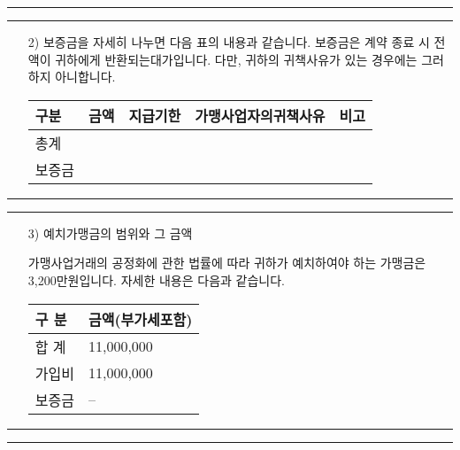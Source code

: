 \documentclass[a5paper,10pt]{oblivoir}
\newcommand\crule[3][black]{\textcolor{#1}{\rule{#2}{#3}}}
\begin{document}
\begin{enumerate}
\newpage
\begin{center}
\crule[red]{4cm}{0.1cm} \crule[blue]{4cm}{0.1cm}
\end{center}
\begin{enumerate}
\item[2)]보증금을 자세히 나누면 다음 표의 내용과 같습니다. 보증금은 계약 종료 시 전액이 귀하에게 반환되는대가입니다. 다만, 귀하의 귀책사유가 있는 경우에는 그러하지 아니합니다.
\begin{center}
\begin{tiny}
\begin{tabu}{|X[-1]|X[-1]|X[-1]|X[c]|X[-1]|}\hline
구분&금액&지급기한& 가맹사업자의귀책사유&비고\\\hline
총계&&&&\\\hline
보증금&&&&\\\hline
\end{tabu}
\end{tiny}
\end{center}
\end{enumerate}

\newpage
\begin{center}
\crule[red]{4cm}{0.1cm} \crule[blue]{4cm}{0.1cm}
\end{center}

\begin{enumerate}
\item[3)] 예치가맹금의 범위와 그 금액
\item[]
가맹사업거래의 공정화에 관한 법률에 따라 귀하가 예치하여야 하는 가맹금은 3,200만원입니다. 자세한 내용은 다음과 같습니다.
\begin{center}
\begin{tiny}
\begin{tabu}{|X[-1]|X[c]|}\hline
구 분&금액(부가세포함)\\\hline
합 계&11,000,000\\\hline
가입비&11,000,000\\\hline
보증금&--\\\hline
\end{tabu}
\end{tiny}
\end{center}
\end{enumerate}


\newpage
\begin{center}
\crule[red]{4cm}{0.1cm} \crule[blue]{4cm}{0.1cm}
\end{center}


\end{enumerate}
\end{document}
